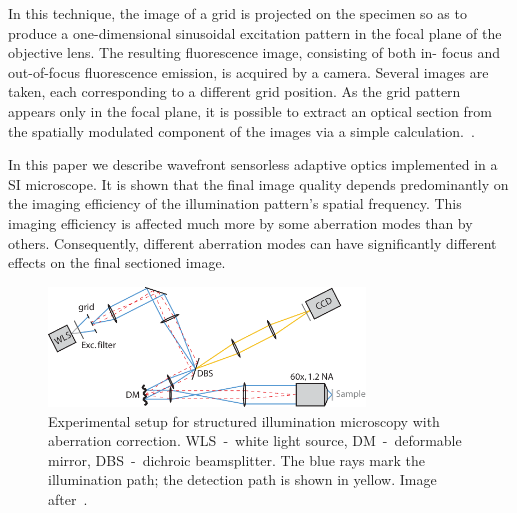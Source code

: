 In this technique, the image of a grid is projected on the specimen so as to 
produce a one-dimensional sinusoidal excitation pattern in the focal plane of 
the objective lens. The resulting fluorescence image, consisting of both in-
focus and out-of-focus fluorescence emission, is acquired by a camera. 
Several images are taken, each corresponding to a different grid position. As 
the grid pattern appears only in the focal plane, it is possible to extract 
an optical section from the spatially modulated component of the images via a 
simple calculation.~\cite{wide_structured_illu_principle}.

In this paper we describe wavefront sensorless adaptive optics implemented in 
a SI microscope. It is shown that the final image quality depends 
predominantly on the imaging efficiency of the illumination pattern’s spatial 
frequency. This imaging efficiency is affected much more by some aberration 
modes than by others. Consequently, different aberration modes can have 
significantly different effects on the final sectioned image.

\begin{figure}
	\centering
		\includegraphics[width=0.75\textwidth]{images/wide_structured_illumination.pdf}
	\caption{Experimental setup for structured illumination microscopy with aberration correction. WLS~-~white light source, DM~-~deformable mirror, DBS~-~dichroic beamsplitter. The blue rays mark the illumination path; the detection path is shown in yellow. Image after~\cite{wide_AOM_structured_illu}.}
	\label{fig:wide_structured_illumination}
\end{figure}

